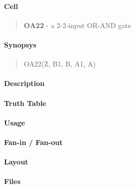 \label{OA22}
\paragraph{Cell}
\begin{quote}
    \textbf{OA22} - a 2-2-input OR-AND gate
\end{quote}

\paragraph{Synopsys}
\begin{quote}
    OA22(Z, B1, B, A1, A)
\end{quote}

\paragraph{Description}

%

\paragraph{Truth Table}
%

\paragraph{Usage}

\paragraph{Fan-in / Fan-out}

\paragraph{Layout}

\paragraph{Files}

\clearpage

